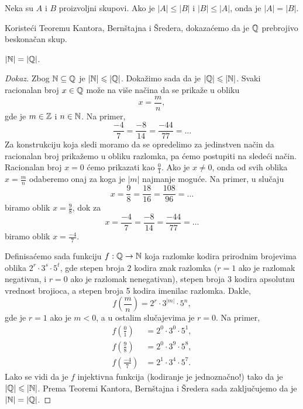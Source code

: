 \begin{THM}
  Neka su $A$ i $B$ proizvoljni skupovi. Ako je $|A| \le |B|$ i $|B| \le |A|$, onda je $|A| = |B|$.
\end{THM}

Koriste\'ci Teoremu Kantora, Bern\v stajna i \v Sredera, dokaza\'cemo da je $\mathbb{Q}$ prebrojivo beskona\v can skup.

\begin{THM}
  $|\mathbb{N}| = |\mathbb{Q}|$.
\end{THM}
\begin{proof}[Dokaz]
  Zbog $\mathbb{N} \subseteq \mathbb{Q}$ je $|\mathbb{N}| \leqslant |\mathbb{Q}|$. Doka\v zimo sada da je $|\mathbb{Q}| \leqslant |\mathbb{N}|$. Svaki racionalan broj
  $x \in \mathbb{Q}$ mo\v ze na vi\v se na\v cina da se prika\v ze u obliku
  $$
    x = \frac mn,
  $$
  gde je $m \in \mathbb{Z}$ i $n \in \mathbb{N}$. Na primer,
  $$
    \frac{-4}{7} = \frac{-8}{14} = \frac{-44}{77} = \ldots
  $$
  Za konstrukciju koja sledi moramo da se opredelimo za jedinstven na\v cin da
  racionalan broj prika\v zemo u obliku razlomka, pa \'cemo postupiti na slede\'ci na\v cin.
  Racionalan broj $x = 0$ \'cemo prikazati kao $\frac 01$. Ako je $x \ne 0$, onda od svih oblika
  $
    x = \frac mn
  $
  odaberemo onaj za koga je $|m|$ najmanje mogu\'ce. Na primer, u slu\v caju
  $$
    x = \frac{9}{8} = \frac{18}{16} = \frac{108}{96} = \ldots
  $$
  biramo oblik $x = \frac{9}{8}$, dok za
  $$
    x = \frac{-4}{7} = \frac{-8}{14} = \frac{-44}{77} = \ldots
  $$
  biramo oblik $x = \frac{-4}{7}$.
  
  Definisa\'cemo sada funkciju $f : \mathbb{Q} \to \mathbb{N}$ koja razlomke kodira prirodnim brojevima oblika $2^r \cdot 3^s \cdot 5^t$,
  gde stepen broja $2$ kodira znak razlomka ($r = 1$ ako je razlomak negativan, i $r = 0$ ako je razlomak nenegativan),
  stepen broja $3$ kodira apsolutnu vrednost brojioca, a stepen broja 5 kodira imenilac razlomka. Dakle,
  $$
    f(\textstyle\frac mn) = 2^r \cdot 3^{|m|} \cdot 5^n,
  $$
  gde je $r = 1$ ako je $m < 0$, a u ostalim slu\v cajevima je $r = 0$. Na primer,
  \begin{align*}
    f(\textstyle\frac 01) &= 2^0 \cdot 3^0 \cdot 5^1,\\[3mm]
    f(\textstyle\frac 98) &= 2^0 \cdot 3^9 \cdot 5^8,\\[3mm]
    f(\textstyle\frac{-4}{7}) &= 2^1 \cdot 3^4 \cdot 5^7.
  \end{align*}
  Lako se vidi da je $f$ injektivna funkcija (kodiranje je jednozna\v cno!) tako da je $|\mathbb{Q}| \leqslant |\mathbb{N}|$. Prema
  Teoremi Kantora, Bern\v stajna i \v Sredera sada zaklju\v cujemo da je $|\mathbb{N}| = |\mathbb{Q}|$.
\end{proof}

